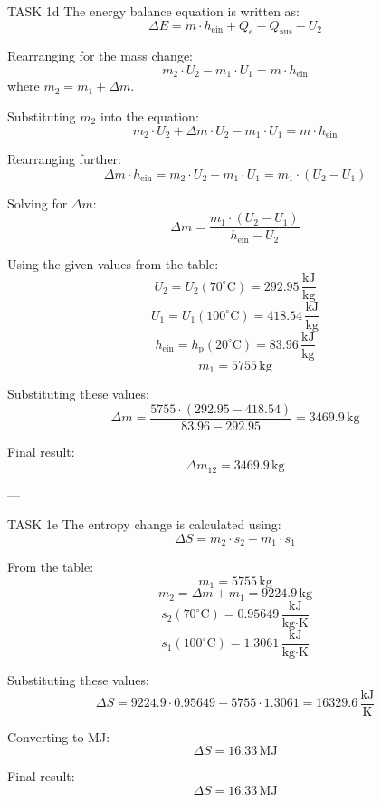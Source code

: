 TASK 1d  
The energy balance equation is written as:  
\[
\Delta E = m \cdot h_{\text{ein}} + Q_e - Q_{\text{aus}} - U_2
\]  

Rearranging for the mass change:  
\[
m_2 \cdot U_2 - m_1 \cdot U_1 = m \cdot h_{\text{ein}}
\]  
where \( m_2 = m_1 + \Delta m \).  

Substituting \( m_2 \) into the equation:  
\[
m_2 \cdot U_2 + \Delta m \cdot U_2 - m_1 \cdot U_1 = m \cdot h_{\text{ein}}
\]  

Rearranging further:  
\[
\Delta m \cdot h_{\text{ein}} = m_2 \cdot U_2 - m_1 \cdot U_1 = m_1 \cdot (U_2 - U_1)
\]  

Solving for \( \Delta m \):  
\[
\Delta m = \frac{m_1 \cdot (U_2 - U_1)}{h_{\text{ein}} - U_2}
\]  

Using the given values from the table:  
\[
U_2 = U_2(70^\circ\text{C}) = 292.95 \, \frac{\text{kJ}}{\text{kg}}
\]  
\[
U_1 = U_1(100^\circ\text{C}) = 418.54 \, \frac{\text{kJ}}{\text{kg}}
\]  
\[
h_{\text{ein}} = h_{\text{p}}(20^\circ\text{C}) = 83.96 \, \frac{\text{kJ}}{\text{kg}}
\]  
\[
m_1 = 5755 \, \text{kg}
\]  

Substituting these values:  
\[
\Delta m = \frac{5755 \cdot (292.95 - 418.54)}{83.96 - 292.95} = 3469.9 \, \text{kg}
\]  

Final result:  
\[
\Delta m_{12} = 3469.9 \, \text{kg}
\]  

---

TASK 1e  
The entropy change is calculated using:  
\[
\Delta S = m_2 \cdot s_2 - m_1 \cdot s_1
\]  

From the table:  
\[
m_1 = 5755 \, \text{kg}
\]  
\[
m_2 = \Delta m + m_1 = 9224.9 \, \text{kg}
\]  
\[
s_2(70^\circ\text{C}) = 0.95649 \, \frac{\text{kJ}}{\text{kg·K}}
\]  
\[
s_1(100^\circ\text{C}) = 1.3061 \, \frac{\text{kJ}}{\text{kg·K}}
\]  

Substituting these values:  
\[
\Delta S = 9224.9 \cdot 0.95649 - 5755 \cdot 1.3061 = 16329.6 \, \frac{\text{kJ}}{\text{K}}
\]  

Converting to MJ:  
\[
\Delta S = 16.33 \, \text{MJ}
\]  

Final result:  
\[
\Delta S = 16.33 \, \text{MJ}
\]